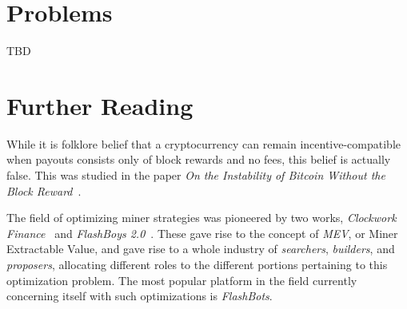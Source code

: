 \section*{Problems}
TBD

\section*{Further Reading}
While it is folklore belief that a cryptocurrency can remain incentive-compatible
when payouts consists only of block rewards and no fees, this belief is actually
false. This was studied in the paper
\emph{On the Instability of Bitcoin Without the Block Reward}~\cite{instability}.

The field of optimizing miner strategies was pioneered by two works,
\emph{Clockwork Finance}~\cite{clockwork} and \emph{FlashBoys 2.0}~\cite{flashboys}.
These gave rise to the concept of \emph{MEV}, or Miner Extractable Value, and
gave rise to a whole industry of \emph{searchers}, \emph{builders}, and \emph{proposers},
allocating different roles to the different portions pertaining to this optimization
problem. The most popular platform in the field currently concerning itself with
such optimizations is \emph{FlashBots}.
